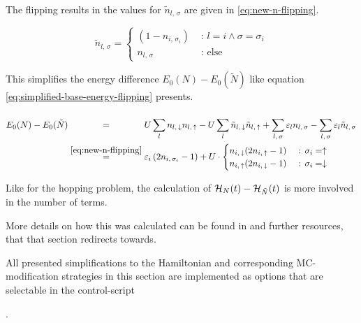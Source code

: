 The flipping results in the values for $\tilde{n}_{l,\,\sigma}$ are given in \autoref{eq:new-n-flipping}.

\begin{equation}
    \label{eq:new-n-flipping}
    \tilde{n}_{l,\,\sigma} = \begin{cases}
        (1 - n_{i,\,\sigma_i})&\text{ : } l = i \land \sigma = \sigma_i   \\
        n_{l,\,\sigma} &\text{ : else}
    \end{cases}
\end{equation}

This simplifies the energy difference $E_0(N)-E_0(\tilde{N})$ like equation \autoref{eq:simplified-base-energy-flipping} presents.

\begin{equation}
    \label{eq:simplified-base-energy-flipping}
    \begin{split}
        E_0(N)-E_0(\tilde{N}) 
        &\stackrel{\phantom{\ref{eq:new-n-flipping}}}{=} U\lsum n_{l,\,\down}n_{l,\,\up}-U\lsum \tilde{n}_{l,\,\down}\tilde{n}_{l,\,\up} 
        + \lsum[l,\,\sigma] \epsl n_{l,\,\sigma} - \lsum[l,\,\sigma] \epsl \tilde{n}_{l,\,\sigma}\\
        &\stackrel{\ref{eq:new-n-flipping}}{=} \epsl[i] \left(2 n_{i,\,\sigma_i} - 1\right) +
        U\cdot \begin{cases}
            n_{i,\,\down} (2 n_{i,\,\up} - 1) &\text{ : } \sigma_i = \up   \\
            n_{i,\,\up} (2 n_{i,\,\down} - 1) &\text{ : } \sigma_i = \down 
        \end{cases}
    \end{split}
\end{equation}

Like for the hopping problem, the calculation of $\HNOft - \HNOft[\tilde{N}]$ is more involved in the number of terms.

More details on how this was calculated can be found in  and further resources, that that section redirects towards.

\vspace{1cm}
All presented simplifications to the Hamiltonian and corresponding MC-modification strategies in this section are implemented as options that are selectable in the control-script   

.
 